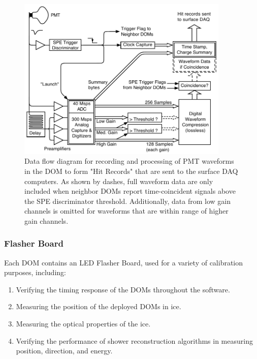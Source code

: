 \begin{figure}[h]
 \centering
 \includegraphics[width=0.9\textwidth]{graphics/dom/functional/domfig3-DOMDataFlow.pdf}
 \caption{Data flow diagram for recording and processing of PMT waveforms in the DOM to form 
 "Hit Records" that are sent to the surface DAQ computers.  As shown by dashes, full waveform data are only included
 when neighbor DOMs report time-coincident signals above the SPE discriminator threshold.  Additionally,
 data from low gain channels is omitted for waveforms that are within range of higher gain channels.}
 \label{fig:domdataflow}
\end{figure}

\subsubsection{\label{sec:flasher}Flasher Board}

Each DOM contains an LED Flasher Board, used for a
variety of calibration purposes, including: 

\begin{enumerate}
\item Verifying the timing response of the DOMs throughout the
  software.
\item Measuring the position of the deployed DOMs in ice.
\item Measuring the optical properties of the ice.
\item Verifying the performance of shower reconstruction algorithms
  in measuring position, direction, and energy.
\end{enumerate}

